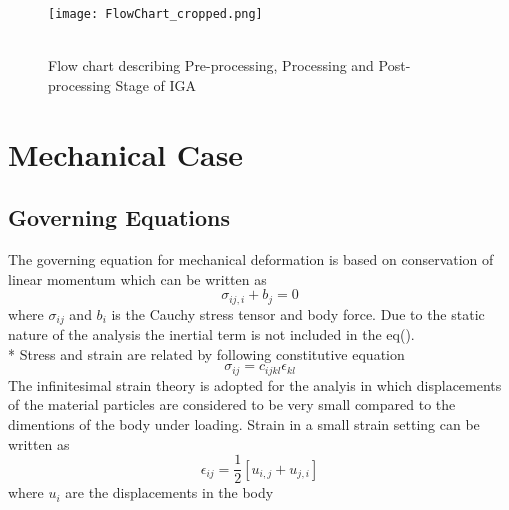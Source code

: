 \documentclass[12pt]{article}
\begin{document}
		\begin{figure}[H]
	\begin{center}
		\texttt{[image: FlowChart\_cropped.png]} 
		\caption{\\Flow chart describing Pre-processing, Processing and Post-processing Stage of IGA}\label{FlowChart1}
	\end{center}
	
\end{figure}


\section{Mechanical Case}


\subsection{Governing Equations}
The governing equation for mechanical deformation is based on conservation of linear momentum which can be written as
\begin{equation}
\sigma_{ij,i} + b_j = 0
\end{equation}
where $ \sigma_{ij} $ and $ b_i $ is the Cauchy stress tensor and body force. Due to the static nature of the analysis the inertial term is not included in the eq().\\*
Stress and strain are related by following constitutive equation
\begin{equation}
\sigma_{ij} = c_{ijkl} \epsilon_{kl}
\end{equation}
The infinitesimal strain theory is adopted for the analyis in which displacements of the material particles are considered to be very small compared to the dimentions of the body under loading. Strain in a small strain setting can be written as
\begin{equation}
\epsilon_{ij}=\frac{1}{2}[u_{i,j}+u_{j,i}]
\end{equation}
where $ u_{i} $ are the displacements in the body
\end{document}
